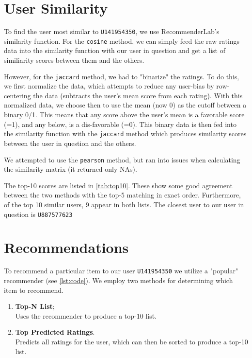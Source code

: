 \section{User Similarity}
To find the user most similar to \texttt{U141954350}, we use RecommenderLab's similarity function.  For the \texttt{cosine} method, we can simply feed the raw ratings data into the similarity function with our user in question and get a list of similiarity scores between them and the others.

However, for the \texttt{jaccard} method, we had to "binarize" the ratings.  To do this, we first normalize the data, which attempts to reduce any user-bias by row-centering the data (subtracts the user's mean score from each rating).  With this normalized data, we choose then to use the mean (now 0) as the cutoff between a binary 0/1.  This means that any score above the user's mean is a favorable score (=1), and any below, is a dis-favorable (=0).  This binary data is then fed into the similarity function with the \texttt{jaccard} method which produces similarity scores between the user in question and the others.

We attempted to use the \texttt{pearson} method, but ran into issues when calculating the similarity matrix (it returned only NAs).

The top-10 scores are listed in \cref{tab:top10}.  These show some good agreement between the two methods with the top-5 matching in exact order.  Furthermore, of the top 10 similar users, 9 appear in both lists.  The closest user to our user in question is \texttt{U887577623}



\section{Recommendations}

To recommend a particular item to our user \texttt{U141954350} we utilize a "popular" recommender (see \vref{lst:code}).  We employ two methods for determining which item to recommend.
\begin{enumerate}
\item \textbf{Top-N List};\\Uses the recommender to produce a top-10 list.
\item \textbf{Top Predicted Ratings}.\\Predicts all ratings for the user, which can then be sorted to produce a top-10 list.
\end{enumerate}

